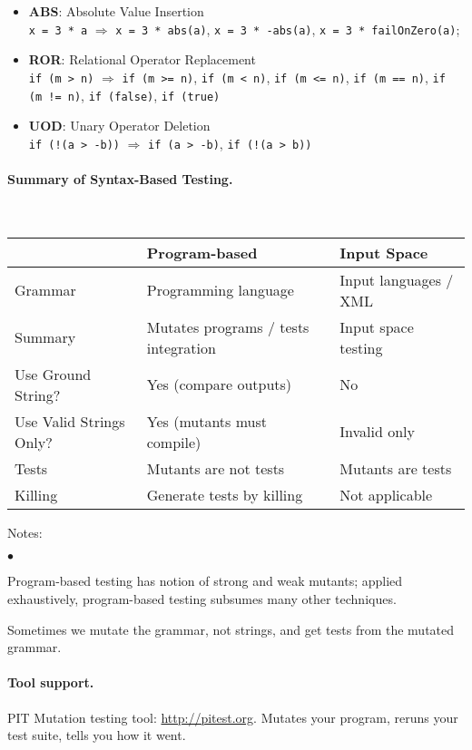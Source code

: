 \documentclass[11pt]{article}
\newcommand{\squishlist}{
 \begin{list}{$\bullet$}
  { \setlength{\itemsep}{0pt}
     \setlength{\parsep}{3pt}
     \setlength{\topsep}{3pt}
     \setlength{\partopsep}{0pt}
     \setlength{\leftmargin}{1.5em}
     \setlength{\labelwidth}{1em}
     \setlength{\labelsep}{0.5em} } }
\newcommand{\squishend}{
  \end{list}  }
\begin{document}
\begin{itemize}
\item {\bf ABS}: Absolute Value Insertion\\
{\tt x = 3 * a}
$\Longrightarrow$ {\tt x = 3 * abs(a)}, {\tt x = 3 * -abs(a)}, {\tt x = 3 * failOnZero(a)};
\item {\bf ROR}: Relational Operator Replacement\\
{\tt if (m > n)} $\Longrightarrow$ {\tt if (m >= n)}, {\tt if (m < n)}, {\tt if (m <= n)}, {\tt if (m == n)}, {\tt if (m != n)}, {\tt if (false)}, {\tt if (true)}
\item {\bf UOD}: Unary Operator Deletion\\
{\tt if (!(a > -b))} $\Longrightarrow$ {\tt if (a > -b)}, {\tt if (!(a > b))}
\end{itemize}


\vspace*{-1em}
\paragraph{Summary of Syntax-Based Testing.}~\\

\begin{tabular}{l|ll}
& Program-based & Input Space \\ \hline
Grammar & Programming language & Input languages / XML \\
Summary & Mutates programs / tests integration & Input space testing \\
Use Ground String? & Yes (compare outputs) & No \\
Use Valid Strings Only? & Yes (mutants must compile) & Invalid only \\
Tests & Mutants are not tests & Mutants are tests \\
Killing & Generate tests by killing & Not applicable \\
\end{tabular}

Notes: 
\squishlist
\item Program-based testing has notion of strong and weak mutants; applied
exhaustively, program-based testing subsumes many other techniques.
\item Sometimes we mutate the grammar, not strings, and get tests from the
mutated grammar.
\squishend

\paragraph{Tool support.} PIT Mutation testing tool: \url{http://pitest.org}. Mutates
your program, reruns your test suite, tells you how it went.
\end{document}
